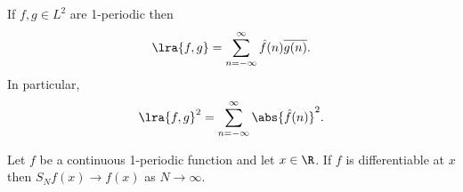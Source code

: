 \documentclass{article}
\begin{document}
\begin{corollary}
	If $f,g\in L^2$ are 1-periodic then
	\begin{align*}
		\lra{f,g} = \sum_{n=-\infty}^\infty \hat f(n)\overline{g(n)}.
	\end{align*}
	In particular,
	\begin{align*}
		\lra{f,g}^2 = \sum_{n=-\infty}^\infty \abs{\hat f(n)}^2.
	\end{align*}
\end{corollary}

\begin{theorem}
	Let $f$ be a continuous 1-periodic function and let $x\in\R$. If $f$ is differentiable
	at $x$ then $S_Nf(x)\to f(x)$ as $N\to\infty$.
\end{theorem}
\end{document}
